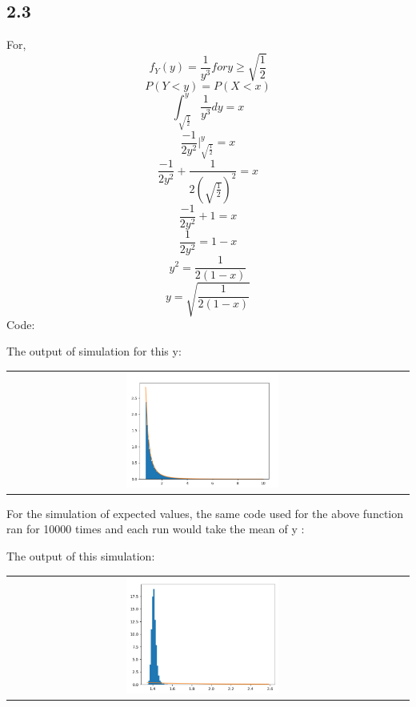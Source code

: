 \documentclass[answers]{exam}
\begin{document}
  \subsection*{2.3}    
    For, $$f_Y (y) = \frac{1}{y^3}
        for y \geq \sqrt{\frac{1}{2}}$$
         $$ P(Y<y)=P(X<x)$$
         $$\int_{\sqrt{\frac{1}{2}}}^{y} \frac{1}{y^3} dy=x$$
         $$ \frac{-1}{2y^2} \Biggr|^{y}_{\sqrt{\frac{1}{2}}}=x$$
         $$ \frac{-1}{2y^2} +\frac{1}{2(\sqrt{\frac{1}{2}})^2}=x$$
         $$ \frac{-1}{2y^2} +1=x$$
         $$ \frac{1}{2y^2} =1-x$$
         $$ y^2=\frac{1}{2(1-x)}$$
         $$ y=\sqrt{\frac{1}{2(1-x)} }$$
         Code:
         
         The output of simulation for this y:
         \begin{center}
          \begin{tabular}{cc}
          \includegraphics[width= 0.4\textwidth]{"Q2/2.3.png"}
        \end{tabular}
      \end{center}
      For the simulation of expected values, the same code used for the above function ran for 10000 times and each run would take the mean of y :
         
      The output of this simulation:
         \begin{center}
        \begin{tabular}{cc}
        \includegraphics[width= 0.4\textwidth]{"Q2/expected value.png"}
      \end{tabular}
    \end{center}
\end{document}
